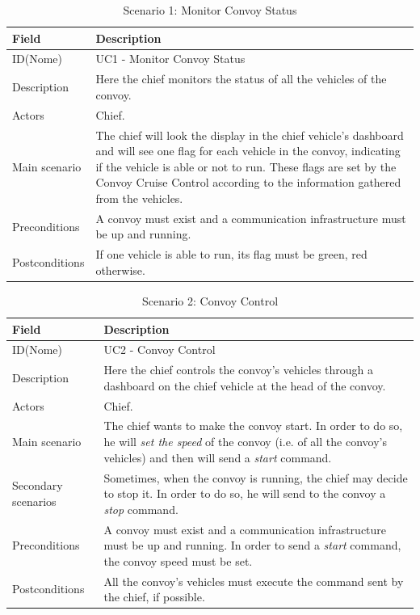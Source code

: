 \documentclass{llncs}
\begin{document}
\begin{table}[H]
\caption{Scenario 1: Monitor Convoy Status}
\label{tab:Scenario1}
\begin{tabular}{| p{2cm} | p{10cm} |}
\hline
\bf{Field} & \bf{Description}\\[3pt]
\hline
ID(Nome) & UC1 - Monitor Convoy Status\\[3pt]
\hline
Description & Here the chief monitors the status of all the vehicles of the convoy.\\[1pt]
\hline
Actors & Chief.\\[3pt]
\hline
Main scenario & The chief will look the display in the chief vehicle's dashboard and will see one flag for each vehicle in the convoy, indicating if the vehicle is able or not to run. These flags are set by the Convoy Cruise Control according to the information gathered from the vehicles.\\[3pt]
\hline
Preconditions & A convoy must exist and a communication infrastructure must be up and running.\\[3pt]
\hline
Postconditions & If one vehicle is able to run, its flag must be green, red otherwise.\\[3pt]
\hline
\end{tabular}
\end{table}

\begin{table}[H]
\caption{Scenario 2: Convoy Control}
\label{tab:Scenario1}
\begin{tabular}{| p{2cm} | p{10cm} |}
\hline
\bf{Field} & \bf{Description}\\[3pt]
\hline
ID(Nome) & UC2 - Convoy Control\\[3pt]
\hline
Description & Here the chief controls the convoy's vehicles through a dashboard on the chief vehicle at the head of the convoy.\\[1pt]
\hline
Actors & Chief.\\[3pt]
\hline
Main scenario & The chief wants to make the convoy start. In order to do so, he will \emph{set the speed} of the convoy (i.e. of all the convoy's vehicles) and then will send a \emph{start} command.\\[3pt]
\hline
Secondary scenarios & Sometimes, when the convoy is running, the chief may decide to stop it. In order to do so, he will send to the convoy a \emph{stop} command.\\[3pt]
\hline
Preconditions & A convoy must exist and a communication infrastructure must be up and running. In order to send a \emph{start} command, the convoy speed must be set.\\[3pt]
\hline
Postconditions & All the convoy's vehicles must execute the command sent by the chief, if possible.\\[3pt]
\hline
\end{tabular}
\end{table}
\end{document}

